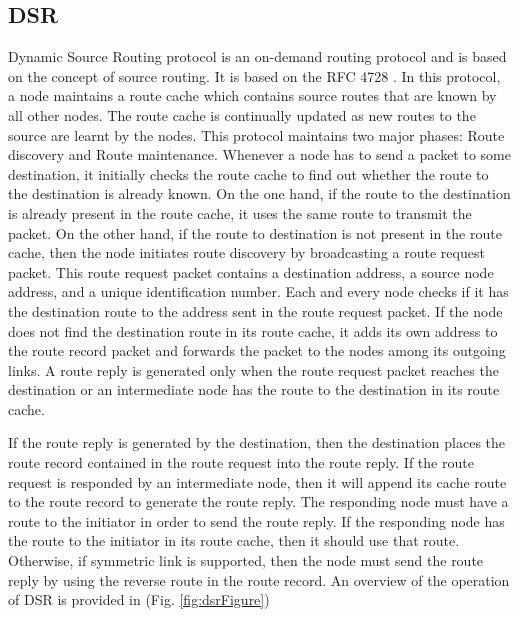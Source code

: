 \documentclass[11pt,draftclsnofoot,onecolumn]{IEEEtran}
\begin{document}
\subsection{DSR}\label{dsr}

Dynamic Source Routing protocol is an on-demand routing protocol and is based on the concept of source routing. It is based on the RFC 4728 \cite{Johnson2007} . In this protocol, a node maintains a route cache which contains source routes that are known by all other nodes. The route cache is continually updated as new routes to the source are learnt by the nodes. This protocol maintains two major phases: Route discovery and Route maintenance. Whenever a node has to send a packet to some destination, it initially checks the route cache to find out whether the route to the destination is already known. On the one hand, if the route to the destination is already present in the route cache, it uses the same route to transmit the packet. On the other hand, if the route to destination is not present in the route cache, then the node initiates route discovery by broadcasting a route request packet. This route request packet contains a destination address, a source node address, and a unique identification number. Each and every node checks if it has the destination route to the address sent in the route request packet. If the node does not find the destination route in its route cache, it adds its own address to the route record packet and forwards the packet to the nodes among its outgoing links. A route reply is generated only when the route request packet reaches the destination or an intermediate node has the route to the destination in its route cache. 
	
If the route reply is generated by the destination, then the destination places the route record contained in the route request into the route reply. If the route request is responded by an intermediate node, then it will append its cache route to the route record to generate the route reply. The responding node must have a route to the initiator in order to send the route reply. If the responding node has the route to the initiator in its route cache, then it should use that route. Otherwise, if symmetric link is supported, then the node must send the route reply by using the reverse route in the route record. An overview of the operation of DSR is provided in  (Fig. \ref{fig:dsrFigure})
\end{document}
